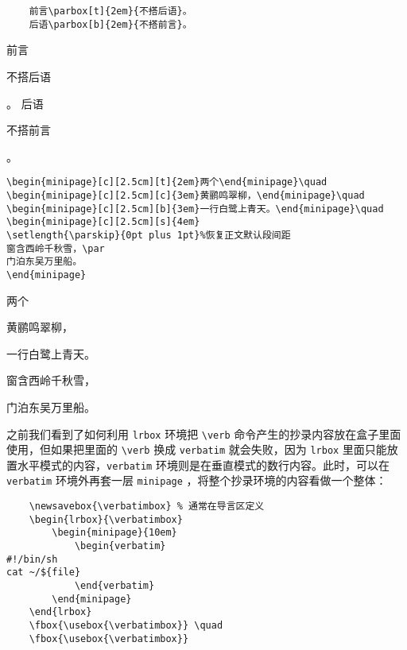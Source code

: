 \begin{minipage}[t]{0.45\textwidth}
\begin{lstlisting}
    前言\parbox[t]{2em}{不搭后语}。
    后语\parbox[b]{2em}{不搭前言}。
\end{lstlisting}
\end{minipage}
\hfill
\begin{minipage}[t]{0.45\textwidth}
    前言\parbox[t]{2em}{不搭后语}。
    后语\parbox[b]{2em}{不搭前言}。
\end{minipage}

\begin{lstlisting}
\begin{minipage}[c][2.5cm][t]{2em}两个\end{minipage}\quad
\begin{minipage}[c][2.5cm][c]{3em}黄鹂鸣翠柳，\end{minipage}\quad
\begin{minipage}[c][2.5cm][b]{3em}一行白鹭上青天。\end{minipage}\quad
\begin{minipage}[c][2.5cm][s]{4em}
\setlength{\parskip}{0pt plus 1pt}%恢复正文默认段间距
窗含西岭千秋雪，\par
门泊东吴万里船。
\end{minipage}
\end{lstlisting}

\begin{minipage}[c][2.5cm][t]{2em}两个\end{minipage}\quad
\begin{minipage}[c][2.5cm][c]{3em}黄鹂鸣翠柳，\end{minipage}\quad
\begin{minipage}[c][2.5cm][b]{3em}一行白鹭上青天。\end{minipage}\quad
\begin{minipage}[c] [2.5cm] [s]{4em}
\setlength{\parskip}{0pt plus 1pt}%
窗含西岭千秋雪，\par
门泊东吴万里船。
\end{minipage}

之前我们看到了如何利用 \verb|lrbox| 环境把 \verb|\verb| 命令产生的抄录内容放在盒子里面使用，但如果把里面的 \verb|\verb| 换成 \verb|verbatim| 就会失败，因为 \verb|lrbox| 里面只能放置水平模式的内容，\verb|verbatim| 环境则是在垂直模式的数行内容。此时，可以在 \verb|verbatim| 环境外再套一层 \verb|minipage| ，将整个抄录环境的内容看做一个整体：
\begin{lstlisting}
    \newsavebox{\verbatimbox} % 通常在导言区定义
    \begin{lrbox}{\verbatimbox}
        \begin{minipage}{10em}
            \begin{verbatim}
#!/bin/sh
cat ~/${file}
            \end{verbatim}
        \end{minipage}
    \end{lrbox}
    \fbox{\usebox{\verbatimbox}} \quad
    \fbox{\usebox{\verbatimbox}}
\end{lstlisting}

